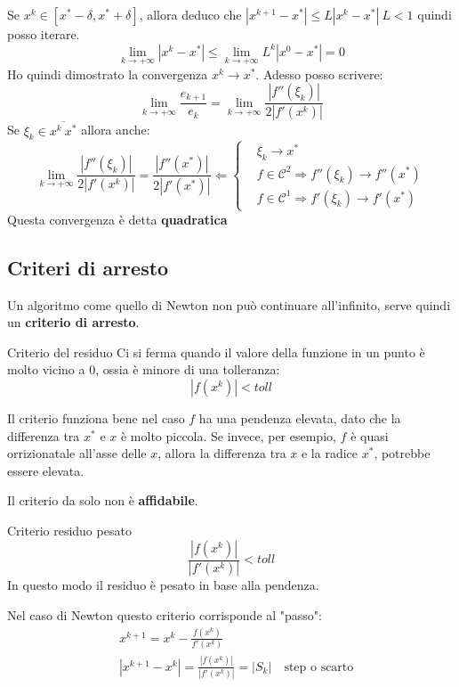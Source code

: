 \documentclass{article}
\begin{document}
Se $x^k\in[x^*-\delta,x^*+\delta]$, allora deduco che $\left|x^{k+1}-x^*\right|\le L\left|x^k-x^*\right|\ L<1$ quindi posso iterare.
\[\lim_{k\to+\infty}\left|x^k-x^*\right|\le\lim_{k\to+\infty}L^k\left|x^0-x^*\right|=0\]
Ho quindi dimostrato la convergenza $x^k\to x^*$. Adesso posso scrivere:
\[\lim_{k\to+\infty}\frac{e_{k+1}}{e_k}=\lim_{k\to+\infty}\frac{\left|f''\left(\xi_k\right)\right|}{2\left|f'(x^k)\right|}\]
Se $\xi_k\in\overline{x^k\ x^*}$ allora anche:
\[
    \lim_{k\to+\infty}\frac{\left|f''\left(\xi_k\right)\right|}{2\left|f'(x^k)\right|}=\frac{\left|f''(x^*)\right|}{2\left|f'(x^*)\right|}\Leftarrow\begin{cases}
         & \xi_k\to x^*                                                              \\
         & f\in\mathcal{C}^2\Rightarrow f''\left(\xi_k\right)\to f''\left(x^*\right) \\
         & f\in\mathcal{C}^1\Rightarrow f'\left(\xi_k\right)\to f'\left(x^*\right)
    \end{cases}\]
    Questa convergenza è detta \textbf{quadratica}

\subsection{Criteri di arresto}
Un algoritmo come quello di Newton non può continuare all'infinito, serve quindi un \textbf{criterio di arresto}.

\begin{theo}{Criterio del residuo}{}
    Ci si ferma quando il valore della funzione in un punto è molto vicino a $0$, ossia è minore di una tolleranza:
    \[\boxed{\left|f(x^k)\right|<toll}\]
\end{theo}
Il criterio funziona bene nel caso $f$ ha una pendenza elevata, dato che la differenza tra $x^*$ e $x$ è molto piccola.
Se invece, per esempio, $f$ è quasi orrizionatale all'asse delle $x$, allora la differenza tra $x$ e la radice $x^*$, potrebbe essere elevata.

Il criterio da solo non è \textbf{affidabile}.
\begin{theo}{Criterio residuo pesato}{}
    \[\frac{\left|f(x^k)\right|}{\left|f'(x^k)\right|}<toll\]
    In questo modo il residuo è pesato in base alla pendenza.
\end{theo}
Nel caso di Newton questo criterio corrisponde al "passo":
\begin{align*}
    &x^{k+1}=x^k-\frac{f(x^k)}{f'(x^k)}\\
    &\left|x^{k+1}-x^k\right|=\frac{\left|f(x^k)\right|}{\left|f'(x^k)\right|}=\left|S_k\right|\quad\text{step o scarto}
\end{align*}
\end{document}
